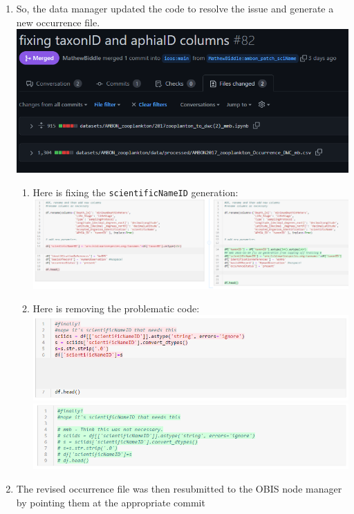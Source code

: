 \documentclass[
]{book}
\providecommand{\tightlist}{%
  \setlength{\itemsep}{0pt}\setlength{\parskip}{0pt}}
\begin{document}
\begin{enumerate}
\item
  So, the data manager updated the code to resolve the issue and generate a new occurrence file.
  \href{https://github.com/ioos/bio_data_guide/pull/82}{\includegraphics{./figs/PR_82.png}}

  \begin{enumerate}
  \def\labelenumii{\arabic{enumii}.}
  \tightlist
  \item
    Here is fixing the \texttt{scientificNameID} generation: \includegraphics{./figs/code_change1.png}
  \item
    Here is removing the problematic code: \includegraphics{./figs/code_change2.png} \includegraphics{./figs/code_change3.png}
  \end{enumerate}
\item
  The revised occurrence file was then resubmitted to the OBIS node manager by pointing them at the appropriate commit

\end{enumerate}
\end{document}
